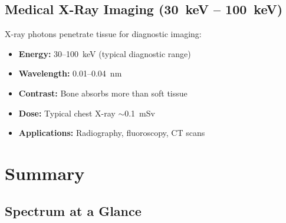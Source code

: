 \subsection{Medical X-Ray Imaging (30~keV -- 100~keV)}

X-ray photons penetrate tissue for diagnostic imaging:
\begin{itemize}
\item \textbf{Energy:} 30--100~keV (typical diagnostic range)
\item \textbf{Wavelength:} 0.01--0.04~nm
\item \textbf{Contrast:} Bone absorbs more than soft tissue
\item \textbf{Dose:} Typical chest X-ray $\sim$0.1~mSv
\item \textbf{Applications:} Radiography, fluoroscopy, CT scans
\end{itemize}

\section{Summary}

\subsection{Spectrum at a Glance}

